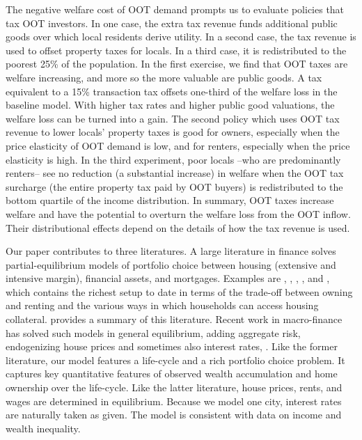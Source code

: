 \documentclass[letterpaper,12pt,dvipsnames,usenames]{article}
\theoremstyle{definition}
\begin{document}
\begin{spacing}{1.25}
The negative welfare cost of OOT demand prompts us to evaluate policies that tax OOT investors. In one case, the extra tax revenue funds additional public goods over which local residents derive utility. In a second case, the tax revenue is used to offset property taxes for locals. In a third case, it is redistributed to the poorest 25\% of the population. In the first exercise, we find that OOT taxes are welfare increasing, and more so the more valuable are public goods. A tax equivalent to a 15\% transaction tax offsets one-third of the welfare loss in the baseline model. With higher tax rates and higher public good valuations, the welfare loss can be turned into a gain. The second policy which uses OOT tax revenue to lower locals' property taxes is good for owners, especially when the price elasticity of OOT demand is low, and for renters, especially when the price elasticity is high. In the third experiment, poor locals --who are predominantly renters-- see no reduction (a substantial increase) in welfare when the OOT tax surcharge (the entire property tax paid by OOT buyers) is redistributed to the bottom quartile of the income distribution. In summary, OOT taxes increase welfare and have the potential to overturn the welfare loss from the OOT inflow. Their distributional effects depend on the details of how the tax revenue is used.


Our paper contributes to three literatures. A large literature in finance solves partial-equilibrium models of portfolio choice between housing (extensive and intensive margin), financial assets, and mortgages. Examples are \citet{campbell-cocco:03}, \citet{YaoZhang}, \citet{Cocco06}, \citet*{VavraEtAl:2016}, and \citet{Chenetal2020}, which contains the richest setup to date in terms of the trade-off between owning and renting and the various ways in which households can access housing collateral. \citet{davisvnb:15} provides a summary of this literature. Recent work in macro-finance has solved such models in general equilibrium, adding  aggregate risk, endogenizing house prices and sometimes also interest rates, \citep[e.g.,][]{favilukis/ludvigson/nieuwerburgh:09,KMV:16,greenwaldguren:20}. Like the former literature, our model features a life-cycle and a rich portfolio choice problem. It captures key quantitative features of observed wealth accumulation and home ownership over the life-cycle. Like the latter literature, house prices, rents, and wages are determined in equilibrium. Because we model one city, interest rates are naturally taken as given. The model is consistent with data on income and wealth inequality.


\end{spacing}
\end{document}
